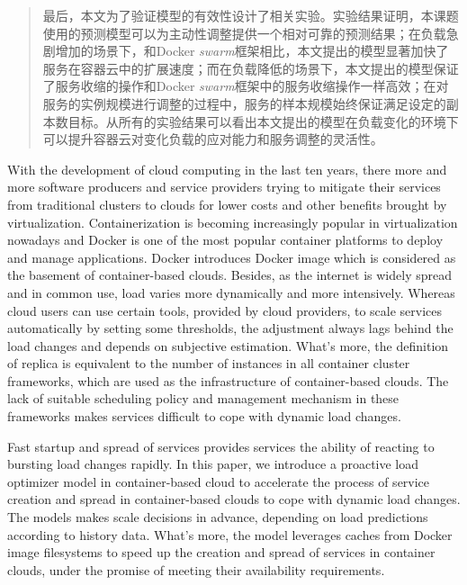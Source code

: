 \begin{abstract}
最后，本文为了验证模型的有效性设计了相关实验。实验结果证明，本课题使用的预测模型可以为主动性调整提供一个相对可靠的预测结果；在负载急剧增加的场景下，和Docker \emph{swarm}框架相比，本文提出的模型显著加快了服务在容器云中的扩展速度；而在负载降低的场景下，本文提出的模型保证了服务收缩的操作和Docker \emph{swarm}框架中的服务收缩操作一样高效；在对服务的实例规模进行调整的过程中，服务的样本规模始终保证满足设定的副本数目标。从所有的实验结果可以看出本文提出的模型在负载变化的环境下可以提升容器云对变化负载的应对能力和服务调整的灵活性。

\end{abstract}

\begin{englishabstract}
With the development of cloud computing in the last ten years, there more and more software producers and service providers trying to mitigate their services from traditional clusters to clouds for lower costs and other benefits brought by virtualization. Containerization is becoming increasingly popular in virtualization nowadays and Docker is one of the most popular container platforms to deploy and manage applications. Docker introduces Docker image which is considered as the basement of container-based clouds. Besides, as the internet is widely spread and in common use, load varies more dynamically and more intensively. Whereas cloud users can use certain tools, provided by cloud providers, to scale services automatically by setting some thresholds, the adjustment always lags behind the load changes and depends on subjective estimation. What's more, the definition of replica is equivalent to the number of instances in all container cluster frameworks, which are used as the infrastructure of container-based clouds. The lack of suitable scheduling policy and management mechanism in these frameworks makes services difficult to cope with dynamic load changes.

Fast startup and spread of services provides services the ability of reacting to bursting load changes rapidly. In this paper, we introduce a proactive load optimizer model in container-based cloud to accelerate the process of service creation and spread in container-based clouds to cope with dynamic load changes. The models makes scale decisions in advance, depending on load predictions according to history data. What's more, the model leverages caches from Docker image filesystems to speed up the creation and spread of services in container clouds, under the promise of meeting their availability requirements.


\end{englishabstract}
